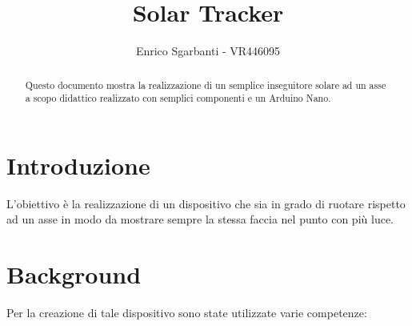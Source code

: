 \documentclass[12pt,oneside,a4paper]{article}
\title{\textbf{Solar Tracker}}
\author{Enrico Sgarbanti - VR446095}
\begin{document}
\maketitle


\begin{abstract}
    Questo documento mostra la realizzazione di un semplice inseguitore solare ad un asse a scopo didattico realizzato con semplici componenti e un Arduino Nano.
\end{abstract}


\section{Introduzione}
L'obiettivo è la realizzazione di un dispositivo che sia in grado di ruotare rispetto ad un asse in modo da mostrare sempre la stessa faccia nel punto con più luce.


\section{Background}
Per la creazione di tale dispositivo sono state utilizzate varie competenze:
\end{document}
